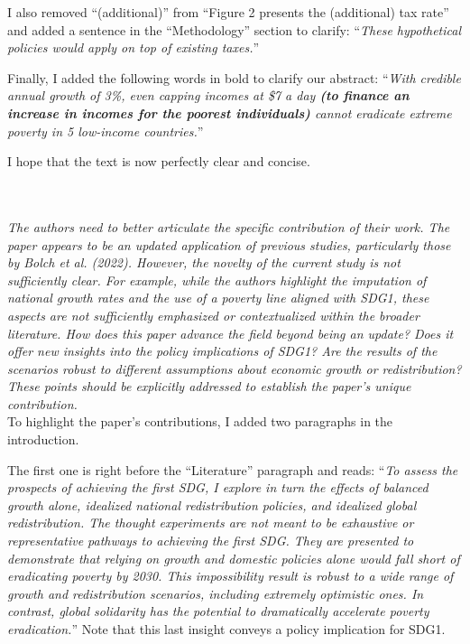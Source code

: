 \documentclass[12pt,english]{article}
\begin{document}
I also removed ``(additional)'' from ``Figure 2 presents the (additional) tax rate'' and added a sentence in the ``Methodology'' section to clarify: ``\textit{These hypothetical policies would apply on top of existing taxes.}'' 

Finally, I added the following words in bold to clarify our abstract: ``\textit{With credible annual growth of 3\%, even capping incomes at \$7 a day \textbf{(to finance an increase in incomes for the poorest individuals)} cannot eradicate extreme poverty in 5 low-income countries.}''

I hope that the text is now perfectly clear and concise.

~\\ ~\\

\textit{The authors need to better articulate the specific contribution of their work. The paper appears to be an updated application of previous studies, particularly those by Bolch et al. (2022). However, the novelty of the current study is not sufficiently clear. For example, while the authors highlight the imputation of national growth rates and the use of a poverty line aligned with SDG1, these aspects are not sufficiently emphasized or contextualized within the broader literature. How does this paper advance the field beyond being an update? Does it offer new insights into the policy implications of SDG1? Are the results of the scenarios robust to different assumptions about economic growth or redistribution? These points should be explicitly addressed to establish the paper's unique contribution. }~\\

To highlight the paper's contributions, I added two paragraphs in the introduction. 

The first one is right before the ``Literature'' paragraph and reads: ``\textit{To assess the prospects of achieving the first SDG, I explore in turn the effects of balanced growth alone, idealized national redistribution policies, and idealized global redistribution. The thought experiments are not meant to be exhaustive or representative pathways to achieving the first SDG. They are presented to demonstrate that relying on growth and domestic policies alone would fall short of eradicating poverty by 2030. This impossibility result is robust to a wide range of growth and redistribution scenarios, including extremely optimistic ones. In contrast, global solidarity has the potential to dramatically accelerate poverty eradication.}'' Note that this last insight conveys a policy implication for SDG1.
\end{document}
